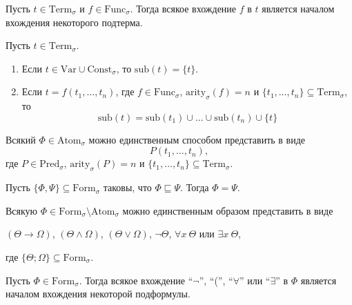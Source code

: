 \documentclass[12pt,a4paper]{article}
\newcommand{\Formul}{\ensuremath{\mathrm{Form}}\xspace}
\newcommand{\Pred}{\ensuremath{\mathrm{Pred}}\xspace}
\newcommand{\Func}{\ensuremath{\mathrm{Func}}\xspace}
\newcommand{\Const}{\ensuremath{\mathrm{Const}}\xspace}
\newcommand{\arity}{\ensuremath{\mathrm{arity}}\xspace}
\newcommand{\Var}{\ensuremath{\mathrm{Var}}\xspace}
\newcommand{\Term}{\ensuremath{\mathrm{Term}}\xspace}
\newcommand{\Atom}{\ensuremath{\mathrm{Atom}}\xspace}
\newcommand{\sub}{\ensuremath{\mathrm{sub}}\xspace}
\begin{document}
    \begin{lemma}
        Пусть $t \in \Term_\sigma$ и $f \in \Func_\sigma$. Тогда всякое вхождение $f$ в $t$ является началом вхождения некоторого подтерма.
    \end{lemma}

    \begin{theorem}[о подтермах]
        Пусть $t \in \Term_\sigma$.
        \begin{enumerate}
            \item Если $t \in \Var \cup \Const_\sigma$, то $\sub(t) = \{t\}$.
            \item Если $t = f(t_1, \dots, t_n)$, где $f \in \Func_\sigma$, $\arity_\sigma(f) = n$ и $\{t_1, \dots, t_n\} \subseteq \Term_\sigma$, то
                \[\sub(t) = \sub(t_1) \cup \dots \cup \sub(t_n) \cup \{t\}\]
        \end{enumerate}
    \end{theorem}

    \begin{theorem}
        Всякий $\Phi \in \Atom_\sigma$ можно единственным способом представить в виде
        \[P(t_1, \dots, t_n),\]
        где $P \in \Pred_\sigma$, $\arity_\sigma(P) = n$ и $\{t_1, \dots, t_n\} \subseteq \Term_\sigma$.
    \end{theorem}

    \begin{lemma}
        Пусть $\{\Phi, \Psi\} \subseteq \Formul_\sigma$ таковы, что $\Phi \sqsubseteq \Psi$. Тогда $\Phi = \Psi$.
    \end{lemma}

    \begin{theorem}
        Всякую $\Phi \in \Formul_\sigma \setminus \Atom_\sigma$ можно единственным образом представить в виде
        \begin{center}
            $(\Theta \rightarrow \Omega)$, \quad
            $(\Theta \wedge \Omega)$, \quad
            $(\Theta \vee \Omega)$, \quad
            $\neg \Theta$, \quad
            $\forall x\ \Theta$ или
            $\exists x\ \Theta$,            
        \end{center}
        где $\{\Theta; \Omega\} \subseteq \Formul_\sigma$.
    \end{theorem}

    \begin{lemma}
        Пусть $\Phi \in \Formul_\sigma$. Тогда всякое вхождение ``$\neg$'', ``('', ``$\forall$'' или ``$\exists$'' в $\Phi$ является началом вхождения некоторой подформулы.
    \end{lemma}
\end{document}
